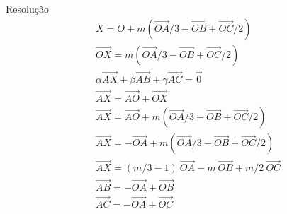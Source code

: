 \begin{frame}{Resolução}
    \begin{align*}
        & X  = O+m(\vec{OA}/3-\vec{OB}+\vec{OC}/2) \\
        & \vec{OX} = m(\vec{OA}/3-\vec{OB}+\vec{OC}/2) \\
        & \alpha\vec{AX}+\beta\vec{AB}+\gamma\vec{AC}=\vec{0} \\
        & \vec{AX} = \vec{AO} + \vec{OX} \\
        & \vec{AX} = \vec{AO} + m(\vec{OA}/3-\vec{OB}+\vec{OC}/2) \\
        & \vec{AX} = -\vec{OA} + m(\vec{OA}/3-\vec{OB}+\vec{OC}/2) \\
        & \vec{AX} = (m/3-1)~ \vec{OA}-m~ \vec{OB} + m/2~ \vec{OC} \\
        & \vec{AB} = -\vec{OA}+\vec{OB} \\
        & \vec{AC} = -\vec{OA}+\vec{OC}
    \end{align*}
\end{frame}



